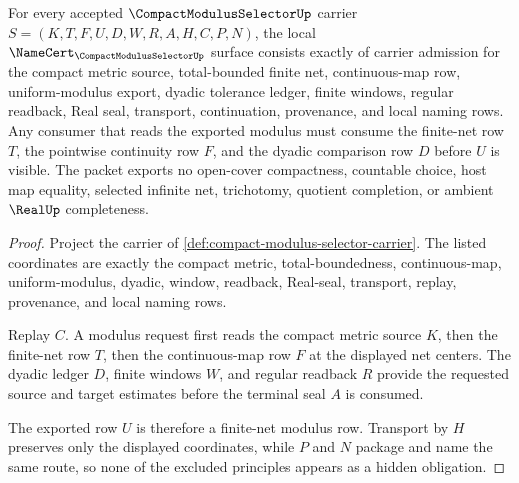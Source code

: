 \begin{theorem}
\label{thm:compact-modulus-selector-namecert-obligations}
For every accepted $\CompactModulusSelectorUp$ carrier $S=(K,T,F,U,D,W,R,A,H,C,P,N)$, the local $\NameCert_{\CompactModulusSelectorUp}$ surface consists exactly of carrier admission for the compact metric source, total-bounded finite net, continuous-map row, uniform-modulus export, dyadic tolerance ledger, finite windows, regular readback, Real seal, transport, continuation, provenance, and local naming rows. Any consumer that reads the exported modulus must consume the finite-net row $T$, the pointwise continuity row $F$, and the dyadic comparison row $D$ before $U$ is visible. The packet exports no open-cover compactness, countable choice, host map equality, selected infinite net, trichotomy, quotient completion, or ambient $\RealUp$ completeness.
\end{theorem}
\begin{proof}
Project the carrier of \autoref{def:compact-modulus-selector-carrier}. The listed coordinates are exactly the compact metric, total-boundedness, continuous-map, uniform-modulus, dyadic, window, readback, Real-seal, transport, replay, provenance, and local naming rows.

Replay $C$. A modulus request first reads the compact metric source $K$, then the finite-net row $T$, then the continuous-map row $F$ at the displayed net centers. The dyadic ledger $D$, finite windows $W$, and regular readback $R$ provide the requested source and target estimates before the terminal seal $A$ is consumed.

The exported row $U$ is therefore a finite-net modulus row. Transport by $H$ preserves only the displayed coordinates, while $P$ and $N$ package and name the same route, so none of the excluded principles appears as a hidden obligation.
\end{proof}

